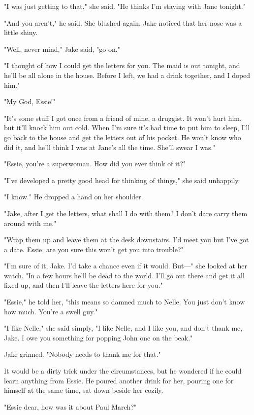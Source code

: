 \documentclass{novel}
\begin{document}
"I was just getting to that," she said. "He thinks I'm staying with Jane tonight."

"And you aren't," he said. She blushed again. Jake noticed that her nose was a little shiny.

"Well, never mind," Jake said, "go on."

"I thought of how I could get the letters for you. The maid is out tonight, and he'll be all alone in the house. Before I left, we had a drink together, and I doped him."

"My God, Essie!"

"It's some stuff I got once from a friend of mine, a druggist. It won't hurt him, but it'll knock him out cold. When I'm sure it's had time to put him to sleep, I'll go back to the house and get the letters out of his pocket. He won't know who did it, and he'll think I was at Jane's all the time. She'll swear I was."

"Essie, you're a superwoman. How did you ever think of it?"

"I've developed a pretty good head for thinking of things," she said unhappily.

"I know." He dropped a hand on her shoulder.

"Jake, after I get the letters, what shall I do with them? I don't dare carry them around with me."

"Wrap them up and leave them at the desk downstairs. I'd meet you but I've got a date. Essie, are you sure this won't get you into trouble?"

"I'm sure of it, Jake. I'd take a chance even if it would. But—" she looked at her watch. "In a few hours he'll be dead to the world. I'll go out there and get it all fixed up, and then I'll leave the letters here for you."

"Essie," he told her, "this means so damned much to Nelle. You just don't know how much. You're a swell guy."

"I like Nelle," she said simply, "I like Nelle, and I like you, and don't thank me, Jake. I owe you something for popping John one on the beak."

Jake grinned. "Nobody needs to thank me for that."

It would be a dirty trick under the circumstances, but he wondered if he could learn anything from Essie. He poured another drink for her, pouring one for himself at the same time, sat down beside her cozily.

"Essie dear, how was it about Paul March?"
\end{document}
